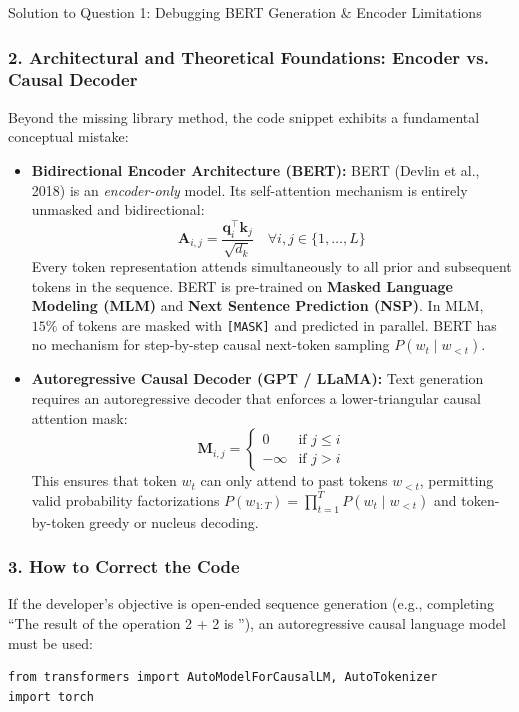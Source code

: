 \documentclass[11pt,a4paper]{article}
\begin{document}
\begin{solutionbox}{Solution to Question 1: Debugging BERT Generation \& Encoder Limitations}
\subsubsection*{2. Architectural and Theoretical Foundations: Encoder vs. Causal Decoder}
Beyond the missing library method, the code snippet exhibits a fundamental conceptual mistake:
\begin{itemize}[leftmargin=1.5em]
    \item \textbf{Bidirectional Encoder Architecture (BERT):} BERT (Devlin et al., 2018) is an \emph{encoder-only} model. Its self-attention mechanism is entirely unmasked and bidirectional:
    \begin{equation}
        \mathbf{A}_{i,j} = \frac{\mathbf{q}_i^\top \mathbf{k}_j}{\sqrt{d_k}} \quad \forall i, j \in \{1, \dots, L\}
    \end{equation}
    Every token representation attends simultaneously to all prior and subsequent tokens in the sequence. BERT is pre-trained on \textbf{Masked Language Modeling (MLM)} and \textbf{Next Sentence Prediction (NSP)}. In MLM, $15\%$ of tokens are masked with \texttt{[MASK]} and predicted in parallel. BERT has no mechanism for step-by-step causal next-token sampling $P(w_t \mid w_{<t})$.
    
    \item \textbf{Autoregressive Causal Decoder (GPT / LLaMA):} Text generation requires an autoregressive decoder that enforces a lower-triangular causal attention mask:
    \begin{equation}
        \mathbf{M}_{i,j} = \begin{cases} 0 & \text{if } j \le i \\ -\infty & \text{if } j > i \end{cases}
    \end{equation}
    This ensures that token $w_t$ can only attend to past tokens $w_{<t}$, permitting valid probability factorizations $P(w_{1:T}) = \prod_{t=1}^T P(w_t \mid w_{<t})$ and token-by-token greedy or nucleus decoding.
\end{itemize}

\subsubsection*{3. How to Correct the Code}
If the developer's objective is open-ended sequence generation (e.g., completing ``The result of the operation 2 + 2 is ''), an autoregressive causal language model must be used:
\begin{lstlisting}[style=pythonstyle]
from transformers import AutoModelForCausalLM, AutoTokenizer
import torch


\end{lstlisting}
\end{solutionbox}
\end{document}
